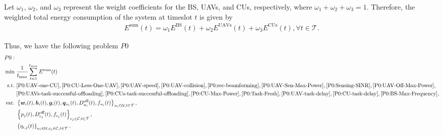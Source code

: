 \documentclass[10pt,journal,compsoc]{IEEEtran}
\begin{document}
Let $\omega_{1}$, $\omega_{2}$, and $\omega_{3}$ represent the weight coefficients for the BS, UAVs, and CUs, respectively, where $\omega_{1} + \omega_{2} + \omega_{3} = 1$. 
Therefore, the weighted total energy consumption of the system at timeslot $t$ is given by
\begin{equation}
\begin{array}{l}
    E^{\text{sum}}(t) = \omega_{1}E^{\text{BS}}(t) + \omega_{2}E^{\text{UAVs}}(t) + \omega_{3}E^{\text{CUs}}(t), \forall t \in \mathcal{T}.
\end{array}
\end{equation}


Thus, we have the following problem $P0$
\begin{align}
P0:\,\, & \notag\\
\min \,\, &\frac{1}{t_{\max}} \sum_{t=1}^{t_{\max}} E^{\text{sum}}(t)\notag\\
\text{s.t.}\,\,& \eqref{P0:UAV-one-CU},  \eqref{P0:CU-Less-One-UAV}, \eqref{P0:UAV-speed}, \eqref{P0:UAV-collision}, \eqref{P0:rec-beamforming}, \eqref{P0:UAV-Sen-Max-Power}, \eqref{P0:Sensing-SINR}, \eqref{P0:UAV-Off-Max-Power}, \notag\\
&  \eqref{P0:UAVs-task-successful-offloading}, \eqref{P0:CUs-task-successful-offloading}, \eqref{P0:CU-Max-Power}, \eqref{P0:Task-Fresh}, \eqref{P0:UAV-task-delay}, \eqref{P0:CU-task-delay}, \eqref{P0:BS-Max-Frequency}, \notag \\
\text{var.}\,\, & \left\{\bm{w}_{i}(t), \bm{b}_{i}(t), \bm{g}_{i}(t), \bm{q}_{u_{i}}(t), D_{u_{i}}^{\text{off}}(t), f_{u_{i}}(t)\right\}_{u_{i} \in \mathcal{U}, t \in \mathcal{T}},  \notag \\
& \left\{p_{j}(t), D_{c_{j}}^{\text{off}}(t), f_{c_{j}}(t)\right\}_{c_{j} \in \mathcal{C}, t \in \mathcal{T}}, \notag \\
& \left\{\eta_{i, j}(t)\right\}_{u_{i} \in \mathcal{U}, c_{j} \in \mathcal{C}, t \in \mathcal{T}}.  \notag
\end{align}
\end{document}
